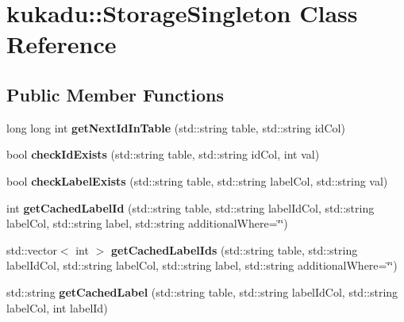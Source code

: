 \hypertarget{classkukadu_1_1StorageSingleton}{}\section{kukadu\+:\+:Storage\+Singleton Class Reference}
\label{classkukadu_1_1StorageSingleton}
\subsection*{Public Member Functions}
\begin{DoxyCompactItemize}
\item 
long long int {\bfseries get\+Next\+Id\+In\+Table} (std\+::string table, std\+::string id\+Col)\hypertarget{classkukadu_1_1StorageSingleton_a068ece291aaa8c67e2968ca2ce888c77}{}\label{classkukadu_1_1StorageSingleton_a068ece291aaa8c67e2968ca2ce888c77}

\item 
bool {\bfseries check\+Id\+Exists} (std\+::string table, std\+::string id\+Col, int val)\hypertarget{classkukadu_1_1StorageSingleton_ae616e1bb376f3b91e94c243d3447b67e}{}\label{classkukadu_1_1StorageSingleton_ae616e1bb376f3b91e94c243d3447b67e}

\item 
bool {\bfseries check\+Label\+Exists} (std\+::string table, std\+::string label\+Col, std\+::string val)\hypertarget{classkukadu_1_1StorageSingleton_aa325126c11d32b06c2c1ff389e350cdf}{}\label{classkukadu_1_1StorageSingleton_aa325126c11d32b06c2c1ff389e350cdf}

\item 
int {\bfseries get\+Cached\+Label\+Id} (std\+::string table, std\+::string label\+Id\+Col, std\+::string label\+Col, std\+::string label, std\+::string additional\+Where=\char`\"{}\char`\"{})\hypertarget{classkukadu_1_1StorageSingleton_a1019fc7b58c697e70469b05cb81f16e5}{}\label{classkukadu_1_1StorageSingleton_a1019fc7b58c697e70469b05cb81f16e5}

\item 
std\+::vector$<$ int $>$ {\bfseries get\+Cached\+Label\+Ids} (std\+::string table, std\+::string label\+Id\+Col, std\+::string label\+Col, std\+::string label, std\+::string additional\+Where=\char`\"{}\char`\"{})\hypertarget{classkukadu_1_1StorageSingleton_afb2d38c5549116777f30ca6c9b6833ed}{}\label{classkukadu_1_1StorageSingleton_afb2d38c5549116777f30ca6c9b6833ed}

\item 
std\+::string {\bfseries get\+Cached\+Label} (std\+::string table, std\+::string label\+Id\+Col, std\+::string label\+Col, int label\+Id)\hypertarget{classkukadu_1_1StorageSingleton_af9bf79f62f37e863d025e0bcc9f45353}{}\label{classkukadu_1_1StorageSingleton_af9bf79f62f37e863d025e0bcc9f45353}


\end{DoxyCompactItemize}
